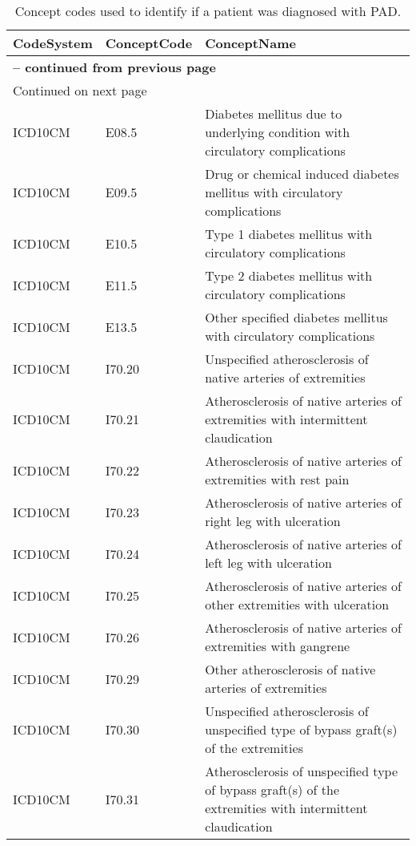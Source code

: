 \begin{longtable}{p{}p{}p{}}
\caption{Concept codes used to identify if a patient was diagnosed with PAD.} \\ 
 CodeSystem & ConceptCode & ConceptName \\ 
  \hline 
\endfirsthead 
\multicolumn{3}{p{\textwidth}}{{ \bfseries \tablename \thetable{} -- continued from previous page}} \ 
\hline CodeSystem & ConceptCode & ConceptName \\ \hline 
\endhead 
\hline \multicolumn{3}{p{\textwidth}}{{Continued on next page}} \\ \hline 
\endfoot 
\hline 
\endlastfoot 
 \hline
ICD10CM & E08.5 & Diabetes mellitus due to underlying condition with circulatory complications \\ 
  ICD10CM & E09.5 & Drug or chemical induced diabetes mellitus with circulatory complications \\ 
  ICD10CM & E10.5 & Type 1 diabetes mellitus with circulatory complications \\ 
  ICD10CM & E11.5 & Type 2 diabetes mellitus with circulatory complications \\ 
  ICD10CM & E13.5 & Other specified diabetes mellitus with circulatory complications \\ 
  ICD10CM & I70.20 & Unspecified atherosclerosis of native arteries of extremities \\ 
  ICD10CM & I70.21 & Atherosclerosis of native arteries of extremities with intermittent claudication \\ 
  ICD10CM & I70.22 & Atherosclerosis of native arteries of extremities with rest pain \\ 
  ICD10CM & I70.23 & Atherosclerosis of native arteries of right leg with ulceration \\ 
  ICD10CM & I70.24 & Atherosclerosis of native arteries of left leg with ulceration \\ 
  ICD10CM & I70.25 & Atherosclerosis of native arteries of other extremities with ulceration \\ 
  ICD10CM & I70.26 & Atherosclerosis of native arteries of extremities with gangrene \\ 
  ICD10CM & I70.29 & Other atherosclerosis of native arteries of extremities \\ 
  ICD10CM & I70.30 & Unspecified atherosclerosis of unspecified type of bypass graft(s) of the extremities \\ 
  ICD10CM & I70.31 & Atherosclerosis of unspecified type of bypass graft(s) of the extremities with intermittent claudication \\ 

\end{longtable}
